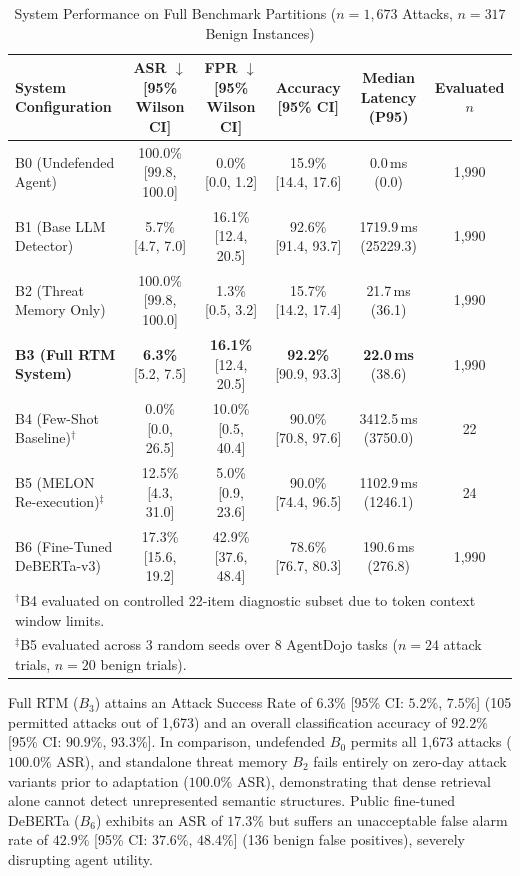 \documentclass[conference]{IEEEtran}
\begin{document}
\begin{table}[t]
\centering
\caption{System Performance on Full Benchmark Partitions ($n=1,673$ Attacks, $n=317$ Benign Instances)}
\label{tab:main_comparison}
\begin{tabular}{l c c c c c}
\hline
\textbf{System Configuration} & \textbf{ASR} $\downarrow$ [95\% Wilson CI] & \textbf{FPR} $\downarrow$ [95\% Wilson CI] & \textbf{Accuracy} [95\% CI] & \textbf{Median Latency (P95)} & \textbf{Evaluated $n$} \\
\hline
B0 (Undefended Agent) & 100.0\% [99.8, 100.0] & 0.0\% [0.0, 1.2] & 15.9\% [14.4, 17.6] & 0.0\,ms (0.0) & 1,990 \\
B1 (Base LLM Detector) & 5.7\% [4.7, 7.0] & 16.1\% [12.4, 20.5] & 92.6\% [91.4, 93.7] & 1719.9\,ms (25229.3) & 1,990 \\
B2 (Threat Memory Only) & 100.0\% [99.8, 100.0] & 1.3\% [0.5, 3.2] & 15.7\% [14.2, 17.4] & 21.7\,ms (36.1) & 1,990 \\
\textbf{B3 (Full RTM System)} & \textbf{6.3\%} [5.2, 7.5] & \textbf{16.1\%} [12.4, 20.5] & \textbf{92.2\%} [90.9, 93.3] & \textbf{22.0\,ms} (38.6) & 1,990 \\
B4 (Few-Shot Baseline)$^\dagger$ & 0.0\% [0.0, 26.5] & 10.0\% [0.5, 40.4] & 90.0\% [70.8, 97.6] & 3412.5\,ms (3750.0) & 22 \\
B5 (MELON Re-execution)$^\ddagger$ & 12.5\% [4.3, 31.0] & 5.0\% [0.9, 23.6] & 90.0\% [74.4, 96.5] & 1102.9\,ms (1246.1) & 24 \\
B6 (Fine-Tuned DeBERTa-v3) & 17.3\% [15.6, 19.2] & 42.9\% [37.6, 48.4] & 78.6\% [76.7, 80.3] & 190.6\,ms (276.8) & 1,990 \\
\hline
\multicolumn{6}{l}{\small $^\dagger$B4 evaluated on controlled 22-item diagnostic subset due to token context window limits.} \\
\multicolumn{6}{l}{\small $^\ddagger$B5 evaluated across 3 random seeds over 8 AgentDojo tasks ($n=24$ attack trials, $n=20$ benign trials).} \\
\hline
\end{tabular}
\end{table}

Full RTM ($B_3$) attains an Attack Success Rate of $6.3\%$ [95\% CI: $5.2\%$, $7.5\%$] (105 permitted attacks out of 1,673) and an overall classification accuracy of $92.2\%$ [95\% CI: $90.9\%$, $93.3\%$]. In comparison, undefended $B_0$ permits all 1,673 attacks ($100.0\%$ ASR), and standalone threat memory $B_2$ fails entirely on zero-day attack variants prior to adaptation ($100.0\%$ ASR), demonstrating that dense retrieval alone cannot detect unrepresented semantic structures. Public fine-tuned DeBERTa ($B_6$) exhibits an ASR of $17.3\%$ but suffers an unacceptable false alarm rate of $42.9\%$ [95\% CI: $37.6\%$, $48.4\%$] (136 benign false positives), severely disrupting agent utility.
\end{document}
